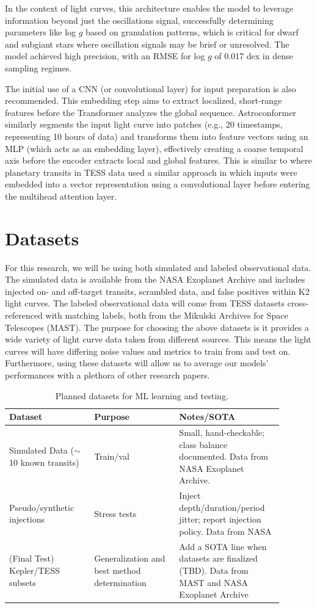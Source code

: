 \documentclass[letterpaper]{article} %
\begin{document}
In the context of light curves, this architecture enables the model to leverage information beyond just the oscillations signal, successfully determining parameters like log $g$ based on granulation patterns, which is critical for dwarf and subgiant stars where oscillation signals may be brief or unresolved. The model achieved high precision, with an RMSE for log $g$ of 0.017 dex in dense sampling regimes.

The initial use of a CNN (or convolutional layer) for input preparation is also recommended. This embedding step aims to extract localized, short-range features before the Transformer analyzes the global sequence. Astroconformer similarly segments the input light curve into patches (e.g., 20 timestamps, representing 10 hours of data) and transforms them into feature vectors using an MLP (which acts as an embedding layer), effectively creating a coarse temporal axis before the encoder extracts local and global features. This is similar to \cite{salinas2023distinguishingtransitfalsepositives} where planetary transits in TESS data used a similar approach in which inputs were embedded into a vector representation using a convolutional layer before entering the multihead attention layer. 

\section*{Datasets}
For this research, we will be using both simulated and labeled observational data. The simulated data is available from the NASA Exoplanet Archive and includes injected on- and off-target transits, scrambled data, and false positives within K2 light curves. The labeled observational data will come from TESS datasets cross-referenced with matching labels, both from the Mikulski Archives for Space Telescopes (MAST). The purpose for choosing the above datasets is it provides a wide variety of light curve data taken from different sources. This means the light curves will have differing noise values and metrics to train from and test on. Furthermore, using these datasets will allow us to average our models' performances with a plethora of other research papers.

\begin{table}[t]
\centering
\begin{tabular}{p{0.28\linewidth} p{0.28\linewidth} p{0.33\linewidth}}
\hline
\textbf{Dataset} & \textbf{Purpose} & \textbf{Notes/SOTA} \\ \hline
Simulated Data ($\sim$10 known transits) & Train/val & Small, hand-checkable; class balance documented. Data from NASA Exoplanet Archive. \\
Pseudo/synthetic injections & Stress tests & Inject depth/duration/period jitter; report injection policy. Data from NASA \\
(Final Test) Kepler/TESS subsets & Generalization and best method determination & Add a SOTA line when datasets are finalized (TBD). Data from MAST and NASA Exoplanet Archive \\ \hline
\end{tabular}
\caption{{Planned datasets for ML learning and testing.}}
\label{{tab:datasets}}
\end{table}
\end{document}
